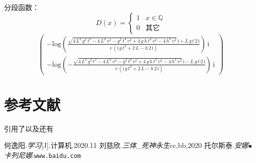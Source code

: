 \documentclass[10pt]{ctexart}%
\begin{document}
	分段函数：
	\begin{equation}
		D(x)=\begin{cases}
		1&x\in \mathbb{Q}\\
		0&\text{其它}
		\end{cases}
	\end{equation}
    \begin{equation}
    	\left(\begin{array}{c} - \mathrm{log}\!\left(\frac{\sqrt{4\, L^2\, g^2\, t^2 - 4\, L^2\, v^2 - g^2\, t^4\, v^2 + 4\, g\, h\, t^2\, v^2 - 4\, h^2\, v^2}\, \mathrm{i} + L\, g\, t\, 2\, \mathrm{i}}{v\, \left(\mathrm{i}\, g\, t^2 + 2\, L - h\, 2\, \mathrm{i}\right)}\right)\, \mathrm{i}\\ - \mathrm{log}\!\left(-\frac{\sqrt{4\, L^2\, g^2\, t^2 - 4\, L^2\, v^2 - g^2\, t^4\, v^2 + 4\, g\, h\, t^2\, v^2 - 4\, h^2\, v^2}\, \mathrm{i} - L\, g\, t\, 2\, \mathrm{i}}{v\, \left(\mathrm{i}\, g\, t^2 + 2\, L - h\, 2\, \mathrm{i}\right)}\right)\, \mathrm{i} \end{array}\right)
    \end{equation}
    \section{参考文献}
    引用了\cite{me}以及\cite{sci}还有\cite{lit}
    \begin{thebibliography}{99}
    	何逸阳.\emph{学习}[J].计算机.2020.11
    	刘慈欣.\emph{三体\_死神永生}cc,bb,2020
	    托尔斯泰.\emph{安娜$\bullet$卡列尼娜}.\texttt{www.baidu.com}
	    
    \end{thebibliography}
    \cite{mitt}%
\end{document}

